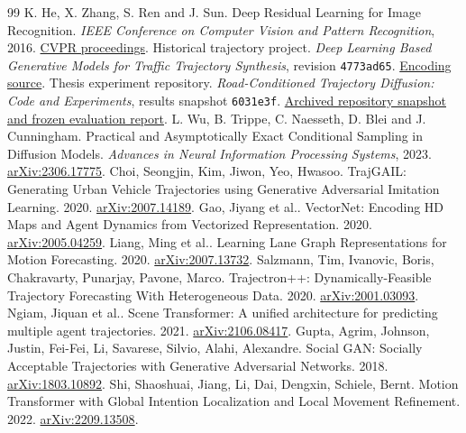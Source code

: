 \begin{thebibliography}{99}
 K. He, X. Zhang, S. Ren and J. Sun. Deep Residual Learning for Image Recognition. \emph{IEEE Conference on Computer Vision and Pattern Recognition}, 2016. \href{https://openaccess.thecvf.com/content_cvpr_2016/html/He_Deep_Residual_Learning_CVPR_2016_paper.html}{CVPR proceedings}.
 Historical trajectory project. \emph{Deep Learning Based Generative Models for Traffic Trajectory Synthesis}, revision \texttt{4773ad65}. \href{https://github.com/LiuJingting0201/Deep-Learning-Based-Generative-Models-for-Traffic-Trajectory-Synthesis/tree/4773ad65bce88d38b8b108ef5e4773fd99883c94}{Encoding source}.
 Thesis experiment repository. \emph{Road-Conditioned Trajectory Diffusion: Code and Experiments}, results snapshot \texttt{6031e3f}. \href{https://github.com/LiuJingting0201/cnr-road-gaf-diffusion/tree/6031e3f}{Archived repository snapshot and frozen evaluation report}.
 L. Wu, B. Trippe, C. Naesseth, D. Blei and J. Cunningham. Practical and Asymptotically Exact Conditional Sampling in Diffusion Models. \emph{Advances in Neural Information Processing Systems}, 2023. \href{https://arxiv.org/abs/2306.17775}{arXiv:2306.17775}.
 Choi, Seongjin, Kim, Jiwon, Yeo, Hwasoo. TrajGAIL: Generating Urban Vehicle Trajectories using Generative Adversarial Imitation Learning. 2020. \href{https://arxiv.org/abs/2007.14189}{arXiv:2007.14189}.
 Gao, Jiyang et al.. VectorNet: Encoding HD Maps and Agent Dynamics from Vectorized Representation. 2020. \href{https://arxiv.org/abs/2005.04259}{arXiv:2005.04259}.
 Liang, Ming et al.. Learning Lane Graph Representations for Motion Forecasting. 2020. \href{https://arxiv.org/abs/2007.13732}{arXiv:2007.13732}.
 Salzmann, Tim, Ivanovic, Boris, Chakravarty, Punarjay, Pavone, Marco. Trajectron++: Dynamically-Feasible Trajectory Forecasting With Heterogeneous Data. 2020. \href{https://arxiv.org/abs/2001.03093}{arXiv:2001.03093}.
 Ngiam, Jiquan et al.. Scene Transformer: A unified architecture for predicting multiple agent trajectories. 2021. \href{https://arxiv.org/abs/2106.08417}{arXiv:2106.08417}.
 Gupta, Agrim, Johnson, Justin, Fei-Fei, Li, Savarese, Silvio, Alahi, Alexandre. Social GAN: Socially Acceptable Trajectories with Generative Adversarial Networks. 2018. \href{https://arxiv.org/abs/1803.10892}{arXiv:1803.10892}.
 Shi, Shaoshuai, Jiang, Li, Dai, Dengxin, Schiele, Bernt. Motion Transformer with Global Intention Localization and Local Movement Refinement. 2022. \href{https://arxiv.org/abs/2209.13508}{arXiv:2209.13508}.

\end{thebibliography}

